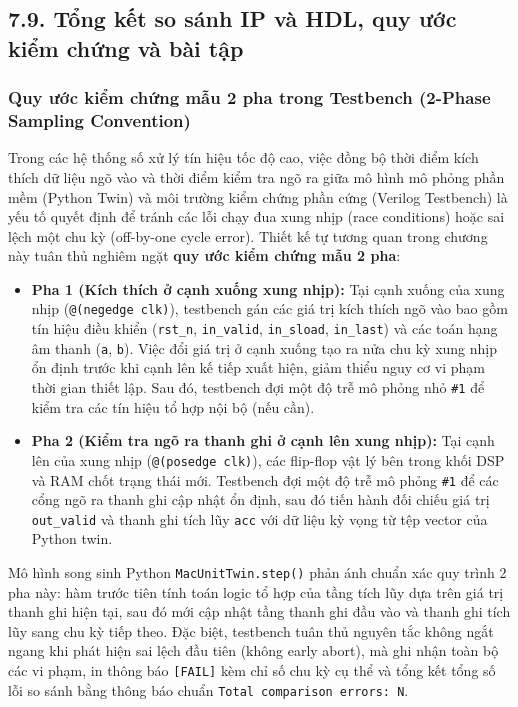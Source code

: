 \subsection*{7.9. Tổng kết so sánh IP và HDL, quy ước kiểm chứng và bài tập}

\subsubsection*{Quy ước kiểm chứng mẫu 2 pha trong Testbench (2-Phase Sampling Convention)}
Trong các hệ thống số xử lý tín hiệu tốc độ cao, việc đồng bộ thời điểm kích thích dữ liệu ngõ vào và thời điểm kiểm tra ngõ ra giữa mô hình mô phỏng phần mềm (Python Twin) và môi trường kiểm chứng phần cứng (Verilog Testbench) là yếu tố quyết định để tránh các lỗi chạy đua xung nhịp (race conditions) hoặc sai lệch một chu kỳ (off-by-one cycle error). Thiết kế tự tương quan trong chương này tuân thủ nghiêm ngặt \textbf{quy ước kiểm chứng mẫu 2 pha}:

\begin{itemize}[leftmargin=1.5em, itemsep=3pt]
    \item \textbf{Pha 1 (Kích thích ở cạnh xuống xung nhịp):}
    Tại cạnh xuống của xung nhịp (\texttt{@(negedge clk)}), testbench gán các giá trị kích thích ngõ vào bao gồm tín hiệu điều khiển (\texttt{rst\_n}, \texttt{in\_valid}, \texttt{in\_sload}, \texttt{in\_last}) và các toán hạng âm thanh (\texttt{a}, \texttt{b}). Việc đổi giá trị ở cạnh xuống tạo ra nửa chu kỳ xung nhịp ổn định trước khi cạnh lên kế tiếp xuất hiện, giảm thiểu nguy cơ vi phạm thời gian thiết lập. Sau đó, testbench đợi một độ trễ mô phỏng nhỏ \texttt{\#1} để kiểm tra các tín hiệu tổ hợp nội bộ (nếu cần).
    
    \item \textbf{Pha 2 (Kiểm tra ngõ ra thanh ghi ở cạnh lên xung nhịp):}
    Tại cạnh lên của xung nhịp (\texttt{@(posedge clk)}), các flip-flop vật lý bên trong khối DSP và RAM chốt trạng thái mới. Testbench đợi một độ trễ mô phỏng \texttt{\#1} để các cổng ngõ ra thanh ghi cập nhật ổn định, sau đó tiến hành đối chiếu giá trị \texttt{out\_valid} và thanh ghi tích lũy \texttt{acc} với dữ liệu kỳ vọng từ tệp vector của Python twin.
\end{itemize}

Mô hình song sinh Python \texttt{MacUnitTwin.step()} phản ánh chuẩn xác quy trình 2 pha này: hàm trước tiên tính toán logic tổ hợp của tầng tích lũy dựa trên giá trị thanh ghi hiện tại, sau đó mới cập nhật tầng thanh ghi đầu vào và thanh ghi tích lũy sang chu kỳ tiếp theo. Đặc biệt, testbench tuân thủ nguyên tắc không ngắt ngang khi phát hiện sai lệch đầu tiên (không early abort), mà ghi nhận toàn bộ các vi phạm, in thông báo \texttt{[FAIL]} kèm chỉ số chu kỳ cụ thể và tổng kết tổng số lỗi so sánh bằng thông báo chuẩn \texttt{Total comparison errors: N}.

